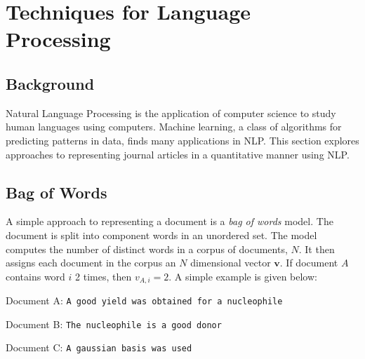 \chapter{Techniques for Language Processing}
\addtocounter{page}{1}

\label{chapt:NLP}
\vspace{-0.5cm}
\section{Background}
Natural Language Processing is the application of computer science to study human languages using computers. Machine learning, a class of algorithms for predicting patterns in data, finds many applications in NLP. This section explores approaches to representing journal articles in a quantitative manner using NLP.
\vspace{-0.5cm}
\section{Bag of Words}
\vspace{-0.5cm}
A simple approach to representing a document is a \emph{bag of words} model. The document is split into component words in an unordered set. The model computes the number of distinct words in a corpus of documents, $N$. It then assigns each document in the corpus an $N$ dimensional vector $\mathbf{v}$. If document $A$ contains word $i$ 2 times, then $v_{A, i } = 2$. A simple example is given below:

Document A: \texttt{A good yield was obtained for a nucleophile}

Document B: \texttt{The nucleophile is a good donor}

Document C: \texttt{A gaussian basis was used}


